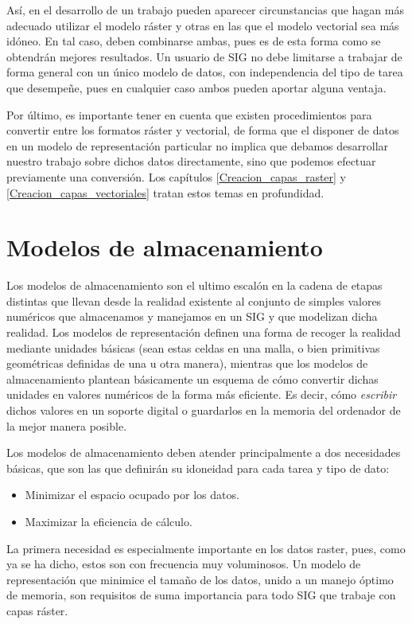 \begin{multicols}{2}
Así, en el desarrollo de un trabajo pueden aparecer circunstancias que hagan más adecuado utilizar el modelo ráster y otras en las que el modelo vectorial sea más idóneo. En tal caso, deben combinarse ambas, pues es de esta forma como se obtendrán mejores resultados. Un usuario de SIG no debe limitarse a trabajar de forma general con un único modelo de datos, con independencia del tipo de tarea que desempeñe, pues en cualquier caso ambos pueden aportar alguna ventaja.

Por último, es importante tener en cuenta que existen procedimientos para convertir entre los formatos ráster y vectorial, de forma que el disponer de datos en un modelo de representación particular no implica que debamos desarrollar nuestro trabajo sobre dichos datos directamente, sino que podemos efectuar previamente una conversión. Los capítulos \ref{Creacion_capas_raster} y \ref{Creacion_capas_vectoriales} tratan estos temas en profundidad.

\section{Modelos de almacenamiento}
\label{Modelos_almacenamiento}

Los modelos de almacenamiento son el ultimo escalón en la cadena de etapas distintas que llevan desde la realidad existente al conjunto de simples valores numéricos que almacenamos y manejamos en un SIG y que modelizan dicha realidad. Los modelos de representación definen una forma de recoger la realidad mediante unidades básicas (sean estas celdas en una malla, o bien primitivas geométricas definidas de una u otra manera), mientras que los modelos de almacenamiento plantean básicamente un esquema de cómo convertir dichas unidades en valores numéricos de la forma más eficiente. Es decir, cómo \emph{escribir} dichos valores en un soporte digital o guardarlos en la memoria del ordenador de la mejor manera posible.

Los modelos de almacenamiento deben atender principalmente a dos necesidades básicas, que son las que definirán su idoneidad para cada tarea y tipo de dato:

\begin{itemize}
 \item Minimizar el espacio ocupado por los datos.
\item Maximizar la eficiencia de cálculo.
\end{itemize}

La primera necesidad es especialmente importante en los datos raster, pues, como ya se ha dicho, estos son con frecuencia muy voluminosos. Un modelo de representación que minimice el tamaño de los datos, unido a un manejo óptimo de memoria, son requisitos de suma importancia para todo SIG que trabaje con capas ráster.


\end{multicols}
